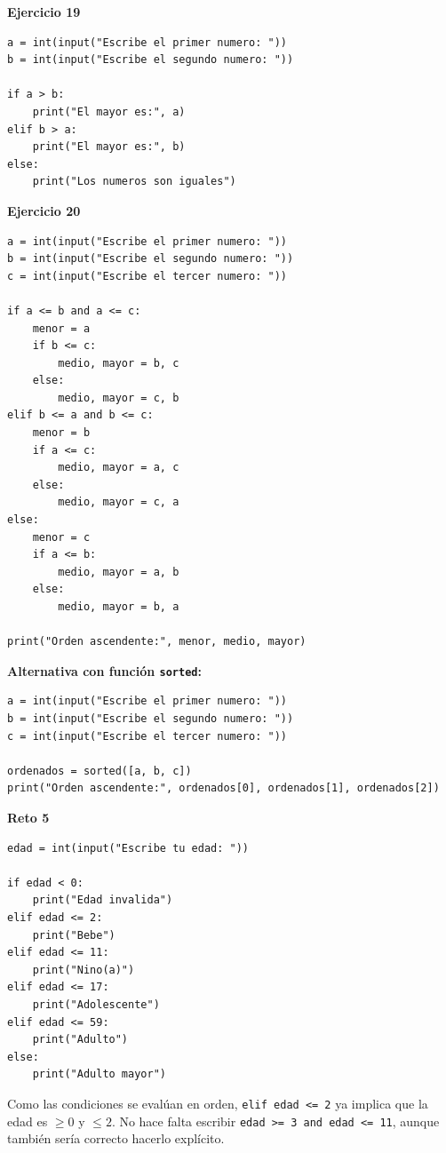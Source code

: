\documentclass[12pt,a4paper]{article}
\begin{document}
\begin{cajaSolucion}
\textbf{Ejercicio 19}
\begin{lstlisting}[style=pythonStyle]
a = int(input("Escribe el primer numero: "))
b = int(input("Escribe el segundo numero: "))

if a > b:
    print("El mayor es:", a)
elif b > a:
    print("El mayor es:", b)
else:
    print("Los numeros son iguales")
\end{lstlisting}
\end{cajaSolucion}

\begin{cajaSolucion}
\textbf{Ejercicio 20}
\begin{lstlisting}[style=pythonStyle]
a = int(input("Escribe el primer numero: "))
b = int(input("Escribe el segundo numero: "))
c = int(input("Escribe el tercer numero: "))

if a <= b and a <= c:
    menor = a
    if b <= c:
        medio, mayor = b, c
    else:
        medio, mayor = c, b
elif b <= a and b <= c:
    menor = b
    if a <= c:
        medio, mayor = a, c
    else:
        medio, mayor = c, a
else:
    menor = c
    if a <= b:
        medio, mayor = a, b
    else:
        medio, mayor = b, a

print("Orden ascendente:", menor, medio, mayor)
\end{lstlisting}

\begin{cajaSolucion}
\textbf{Alternativa con función \texttt{sorted}:}
\begin{lstlisting}[style=pythonStyle]
a = int(input("Escribe el primer numero: "))
b = int(input("Escribe el segundo numero: "))
c = int(input("Escribe el tercer numero: "))

ordenados = sorted([a, b, c])
print("Orden ascendente:", ordenados[0], ordenados[1], ordenados[2])
\end{lstlisting}
\end{cajaSolucion}
\end{cajaSolucion}

\begin{cajaSolucion}
\textbf{Reto 5}
\begin{lstlisting}[style=pythonStyle]
edad = int(input("Escribe tu edad: "))

if edad < 0:
    print("Edad invalida")
elif edad <= 2:
    print("Bebe")
elif edad <= 11:
    print("Nino(a)")
elif edad <= 17:
    print("Adolescente")
elif edad <= 59:
    print("Adulto")
else:
    print("Adulto mayor")
\end{lstlisting}

\begin{cajaNota}
Como las condiciones se evalúan en orden, \texttt{elif edad <= 2} ya implica que la edad es $\geq 0$ y $\leq 2$. No hace falta escribir \texttt{edad >= 3 and edad <= 11}, aunque también sería correcto hacerlo explícito.
\end{cajaNota}
\end{cajaSolucion}
\end{document}
